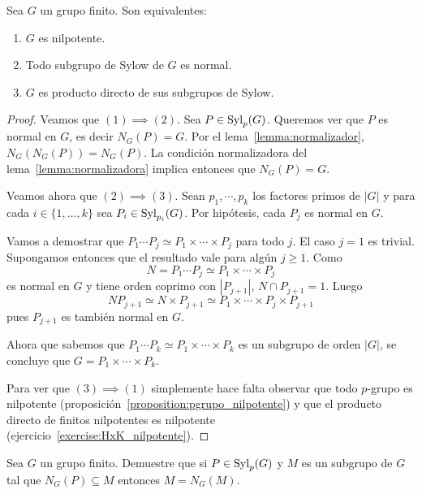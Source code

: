 \begin{theorem}
	\label{theorem:nilpotente:eq}
	Sea $G$ un grupo finito. Son equivalentes:
	\begin{enumerate}
		\item $G$ es nilpotente.
		\item Todo subgrupo de Sylow de $G$ es normal.
		\item $G$ es producto directo de sus subgrupos de Sylow.
	\end{enumerate}
\end{theorem}

\begin{proof}
	Veamos que $(1)\implies(2)$. Sea $P\in\mathrm{Syl}_p(G)$. Queremos ver que $P$ es
	normal en $G$, es decir $N_G(P)=G$.  Por el lema~\ref{lemma:normalizador},
	$N_G(N_G(P))=N_G(P)$. La condición normalizadora del lema~\ref{lemma:normalizadora} implica entonces que $N_G(P)=G$.

	Veamos ahora que $(2)\implies(3)$. Sean $p_1,\cdots,p_k$ los factores
	primos de $|G|$ y para cada $i\in\{1,\dots,k\}$ sea $P_i\in\mathrm{Syl}_{p_i}(G)$.
	Por hipótesis, cada $P_j$ es normal en $G$.

	Vamos a demostrar que $P_1\cdots P_j\simeq P_1\times\cdots\times P_j$ para todo $j$.
	El caso $j=1$ es trivial. Supongamos entonces que el resultado vale para
	algún $j\geq 1$. Como 
	\[
	N=P_1\cdots P_j\simeq P_1\times\cdots\times P_j
	\]
	es normal en $G$ y tiene orden coprimo con $|P_{j+1}|$, $N\cap
	P_{j+1}=1$. Luego
	\[
		NP_{j+1}\simeq N\times P_{j+1}\simeq P_1\times\cdots\times P_j\times P_{j+1}
	\]
	pues $P_{j+1}$ es también normal en $G$. 

	Ahora que sabemos que $P_1\cdots P_k\simeq P_1\times\cdots\times P_k$ es un
	subgrupo de orden $|G|$, se concluye que $G=P_1\times\cdots\times P_k$.

	Para ver que $(3)\implies(1)$ simplemente hace falta observar que todo
	$p$-grupo es nilpotente (proposición~\ref{proposition:pgrupo_nilpotente}) y
	que el producto directo de finitos nilpotentes es nilpotente
	(ejercicio~\ref{exercise:HxK_nilpotente}).
\end{proof}

\begin{exercise}
	\label{exercise:truco}
	Sea $G$ un grupo finito. Demuestre que si $P\in\mathrm{Syl}_p(G)$ y $M$ es un subgrupo de $G$ tal que
	$N_G(P)\subseteq M$ entonces $M=N_G(M)$. 
\end{exercise}


